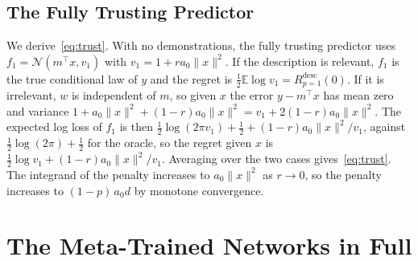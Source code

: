 \documentclass{article}
\newcommand{\E}{\mathbb{E}}
\begin{document}
\subsection{The Fully Trusting Predictor}\label{app:trust}
We derive~\eqref{eq:trust}. With no demonstrations, the fully trusting predictor uses $f_1 = \mathcal{N}(m^\top x, v_1)$ with $v_1 = 1 + r a_0 \|x\|^2$. If the description is relevant, $f_1$ is the true conditional law of $y$ and the regret is $\tfrac12 \E \log v_1 = R^{\mathrm{desc}}_{p=1}(0)$. If it is irrelevant, $w$ is independent of $m$, so given $x$ the error $y - m^\top x$ has mean zero and variance $1 + a_0\|x\|^2 + (1-r)a_0\|x\|^2 = v_1 + 2(1-r)a_0\|x\|^2$. The expected log loss of $f_1$ is then $\tfrac12 \log(2\pi v_1) + \tfrac12 + (1-r)a_0\|x\|^2/v_1$, against $\tfrac12 \log(2\pi) + \tfrac12$ for the oracle, so the regret given $x$ is $\tfrac12 \log v_1 + (1-r)a_0\|x\|^2/v_1$. Averaging over the two cases gives~\eqref{eq:trust}. The integrand of the penalty increases to $a_0\|x\|^2$ as $r \to 0$, so the penalty increases to $(1-p)\,a_0 d$ by monotone convergence.

\section{The Meta-Trained Networks in Full}\label{app:networks}
\end{document}

